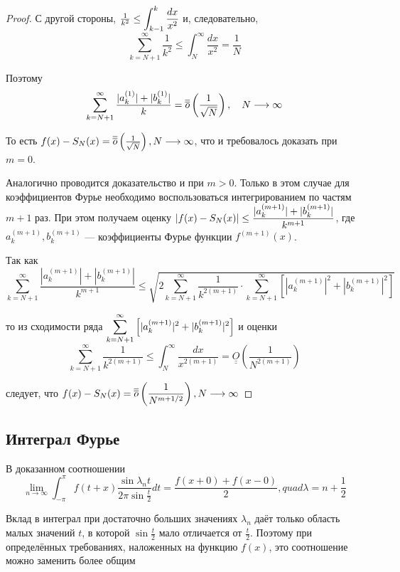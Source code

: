 \begin{proof}
    С другой стороны, $\frac{1}{k^2} \leq \displaystyle\int_{k - 1}^k \frac{dx}{x^2}$ и,
    следовательно,
    \[ 
        \sum_{k = N + 1}^\infty \frac{1}{k^2} \leq \int_N^\infty \frac{dx}{x^2} 
        = \frac{1}{N}
    \]

    Поэтому \[
        \sum_{k = N + 1}^\infty \frac{|a_k^{(1)}| + |b_k^{(1)}|}{k} =
        \overline{\overline{o}} \left( \frac{1}{\sqrt{N}} \right), \quad
        N \underset{}{\longrightarrow} \infty
    \]

    То есть $f(x) - S_N(x) = \overline{\overline{o}} \left( \frac{1}{\sqrt{N}} \right),
    N \underset{}{\longrightarrow} \infty$, что и требовалось доказать при $m = 0$.

    Аналогично проводится доказательство и при $m > 0$. Только в этом случае
    для коэффициентов Фурье необходимо воспользоваться интегрированием по
    частям $m + 1$ раз. При этом получаем оценку $|f(x) - S_N(x)| \leq
    \displaystyle\frac{|a_k^{(m + 1)}| + |b_k^{(m + 1)}|}{k^{m + 1}}$, где 
    $a_k^{(m + 1)}, b_k^{(m + 1)}$ --- коэффициенты Фурье функции
    $f^{(m + 1)}(x)$.

    Так как \[
        \sum_{k = N + 1}^\infty \frac{|a_k^{(m + 1)}| + |b_k^{(m + 1)}|}{k^{m + 1}} \leq
        \sqrt{
            2 \sum_{k = N + 1}^\infty \frac{1}{k^{2(m + 1)}} \cdot
            \sum_{k = N + 1}^\infty \left[ |a_k^{(m + 1)}|^2 + |b_k^{(m + 1)}|^2 \right]
        }
    \]

    то из сходимости ряда $\displaystyle\sum_{k = N + 1}^\infty \left[ |a_k^{(m + 1)}|^2 + |b_k^{(m + 1)}|^2 \right]$
    и оценки \[
        \sum_{k = N + 1}^\infty \frac{1}{k^{2(m + 1)}} \leq
        \int_N^\infty \frac{dx}{x^{2(m + 1)}} =
        \underline{\underline{O}} \left( \frac{1}{N^{2 (m + 1)}} \right)
    \]

    следует, что $f(x) - S_N(x) = \overline{\overline{o}} \left(
        \displaystyle\frac{1}{N^{m + 1/2}}
    \right), N \underset{}{\longrightarrow} \infty$
\end{proof}


\subsection{Интеграл Фурье}

В доказанном соотношении
\[
    \lim_{n \to \infty} \int_{-\pi}^\pi f(t + x) \frac{\sin \lambda_n t}{2\pi \sin \frac{t}{2}} dt =
    \frac{f(x + 0) + f(x - 0)}{2}, quad \lambda = n + \frac{1}{2}
\]

Вклад в интеграл при достаточно больших значениях $\lambda_n$ даёт только
область малых значений $t$, в которой $\sin \frac{t}{2}$ мало отличается от
$\frac{t}{2}$. Поэтому при определённых требованиях, наложенных на функцию
$f(x)$, это соотношение можно заменить более общим

